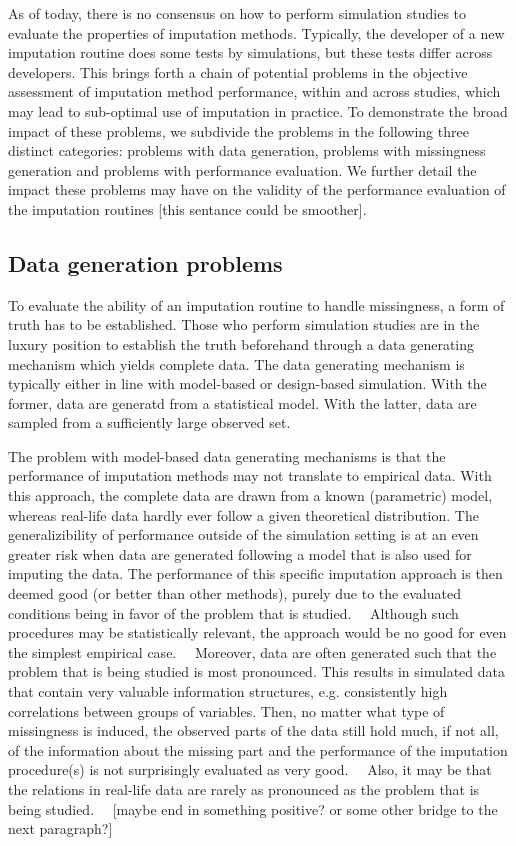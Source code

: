 \documentclass[bimj,fleqn]{w-art}
\theoremstyle{plain}
\theoremstyle{definition}
\begin{document}
As of today, there is no consensus on how to perform simulation studies to evaluate the properties of imputation methods. Typically, the developer of a new imputation routine does some tests by simulations, but these tests differ across developers. This brings forth a chain of potential problems in the objective assessment of imputation method performance, within and across studies, which may lead to sub-optimal use of imputation in practice. To demonstrate the broad impact of these problems, we subdivide the problems in the following three distinct categories: problems with data generation, problems with missingness generation and problems with performance evaluation. We further detail the impact these problems may have on the validity of the performance evaluation of the imputation routines [this sentance could be smoother]. 


\subsection{Data generation problems}

To evaluate the ability of an imputation routine to handle missingness, a form of truth has to be established. Those who perform simulation studies are in the luxury position to establish the truth beforehand through a data generating mechanism which yields complete data. The data generating mechanism is typically either in line with model-based or design-based simulation. With the former, data are generatd from a statistical model. With the latter, data are sampled from a sufficiently large observed set. 

The problem with model-based data generating mechanisms is that the performance of imputation methods may not translate to empirical data. With this approach, the complete data are drawn from a known (parametric) model, whereas real-life data hardly ever follow a given theoretical distribution. The generalizibility of performance outside of the simulation setting is at an even greater risk when data are generated following a model that is also used for imputing the data. The performance of this specific imputation approach is then deemed good (or better than other methods), purely due to the evaluated conditions being in favor of the problem that is studied. ~~Although such procedures may be statistically relevant, the approach would be no good for even the simplest empirical case.~~ Moreover, data are often generated such that the problem that is being studied is most pronounced. This results in simulated data that contain very valuable information structures, e.g. consistently high correlations between groups of variables. Then, no matter what type of missingness is induced, the observed parts of the data still hold much, if not all, of the information about the missing part and the performance of the imputation procedure(s) is not surprisingly evaluated as very good. ~~Also, it may be that the relations in real-life data are rarely as pronounced as the problem that is being studied.~~ [maybe end in something positive? or some other bridge to the next paragraph?]
\end{document}
